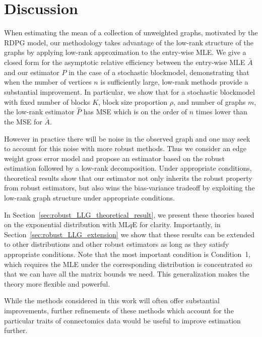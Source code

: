 
\chapter{Discussion}
\label{chap:discussion}

When estimating the mean of a collection of unweighted graphs, motivated by the RDPG model, our methodology takes advantage of the low-rank structure of the graphs by applying low-rank approximation to the entry-wise MLE. 
We give a closed form for the asymptotic relative efficiency between the entry-wise MLE $\bar{A}$ and our estimator $\hat{P}$ in the case of a stochastic blockmodel, demonstrating that when the number of vertices $n$ is sufficiently large, low-rank methods provide a substantial improvement.
In particular, we show that for a stochastic blockmodel with fixed number of blocks $K$, block size proportion $\rho$, and number of graphs $m$, the low-rank estimator $\hat{P}$ has MSE which is on the order of $n$ times lower than the MSE for $\bar{A}$.

However in practice there will be noise in the observed graph and one may seek to account for this noise with more robust methods. Thus we consider an edge weight gross error model and propose an estimator based on the robust estimation followed by a low-rank decomposition. Under appropriate conditions, theoretical results show that our estimator not only inherits the robust property from robust estimators, but also wins the bias-variance tradeoff by exploiting the low-rank graph structure under appropriate conditions.

In Section~\ref{sec:robust_LLG_theoretical_result}, we present these theories based on the exponential distribution with ML$q$E for clarity. Importantly, in Section~\ref{sec:robust_LLG_extension} we show that these results can be extended to other distributions and other robust estimators as long as they satisfy appropriate conditions. Note that the most important condition is Condition~1, which requires the MLE under the corresponding distribution is concentrated so that we can have all the matrix bounds we need. This generalization makes the theory more flexible and powerful.





While the methods considered in this work will often offer substantial improvements, further refinements of these methods which account for the particular traits of connectomics data would be useful to improve estimation further.


